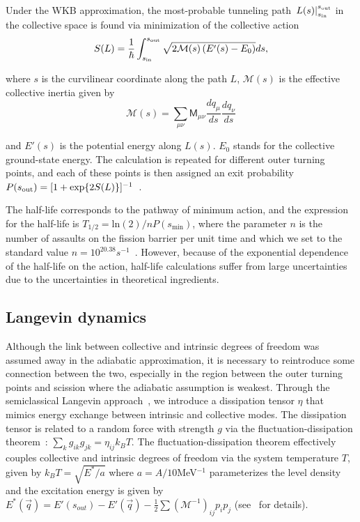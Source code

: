 Under the WKB approximation, the most-probable tunneling path $\left. L(s) \right|_{s_{\rm in}}^{s_{\rm out}}$ in the collective space is found via minimization of the collective action
\begin{equation}\label{eq:action} 
S(L) = \frac{1}{\hbar}\int_{s_{\rm in}}^{s_{\rm out}} \sqrt{2\mathcal{M}(s)\left(E'(s)-E_0\right)}ds,
\end{equation} 

\noindent where $s$ is the curvilinear coordinate along the path $L$, $\mathcal{M}(s)$ is the effective collective inertia given by~\cite{Sadhukhan2013}
\begin{equation}
\mathcal{M}(s) = \sum_{\mu\nu} \mathsf{M}_{\mu\nu} \frac{dq_\mu}{ds} \frac{dq_\nu}{ds}
\end{equation}

\noindent and $E'(s)$ is the potential energy along $L(s)$. $E_0$ stands for the collective ground-state energy. The calculation is repeated for different outer turning points, and each of these points is then assigned an exit probability $P(s_{\rm out})=[1+\exp{2S(L)}]^{-1}$~\cite{Baran1978}. 

The half-life corresponds to the pathway of minimum action, and the expression for the half-life is $T_{1/2} = \mathrm{ln}(2)/nP(s_\mathrm{min})$, where the parameter $n$ is the number of assaults on the fission barrier per unit time and which we set to the standard value $n=10^{20.38} s^{-1}$~\cite{Baran1978}. However, because of the exponential dependence of the half-life on the action, half-life calculations suffer from large uncertainties due to the uncertainties in theoretical ingredients.

\subsection{Langevin dynamics}

Although the link between collective and intrinsic degrees of freedom was assumed away in the adiabatic approximation, it is necessary to reintroduce some connection between the two, especially in the region between the outer turning points and scission where the adiabatic assumption is weakest. Through the semiclassical Langevin approach~\cite{Kubo1966}, we introduce a dissipation tensor $\eta$ that mimics energy exchange between intrinsic and collective modes. The dissipation tensor is related to a random force with strength $g$ via the fluctuation-dissipation theorem~\cite{Callen1951,Kubo1966}: $\sum_k g_{ik}g_{jk} = \eta_{ij}k_BT$. The fluctuation-dissipation theorem effectively couples collective and intrinsic degrees of freedom via the system temperature $T$, given by $k_BT = \sqrt{E^*/a}$ where $a=A/10$MeV$^{-1}$ parameterizes the level density and the excitation energy is given by $E^*(\vec{q}) = E'(s_{out}) - E'(\vec{q}) - \frac{1}{2}\sum\left(\mathcal{M}^{-1}\right)_{ij}p_i p_j$ (see~\cite{Abe1996,Frobrich1998,Sadhukhan2016} for details).


